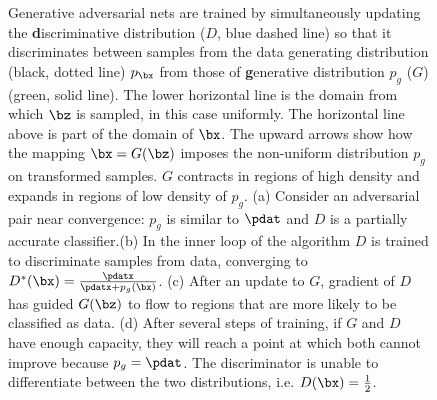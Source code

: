 
\begin{figure}[htb]
	\resizebox{0.2\textwidth}{!}{\subfigure[]{}}\hfill
	\resizebox{0.2\textwidth}{!}{\subfigure[]{}}\hfill
	\resizebox{0.2\textwidth}{!}{\subfigure[]{}}\hfill
	\resizebox{0.2\textwidth}{!}{\subfigure[]{}}\hfill

	\caption{Generative adversarial nets are trained by simultaneously updating the \textbf{d}iscriminative distribution ($D$, blue dashed line) so that it discriminates between samples from the data generating distribution (black, dotted line) $p_{\bx}$ from those of \textbf{g}enerative distribution $p_g$ ($G$) (green, solid line). The lower horizontal line is the domain from which $\bz$ is sampled, in this case uniformly. The horizontal line above is part of the domain of $\bx$. The upward arrows show how the mapping $\bx = G(\bz)$ imposes the non-uniform distribution $p_g$ on transformed samples. $G$ contracts in regions of high density and expands in regions of low density of $p_g$. (a) Consider an adversarial pair near convergence: $p_g$ is similar to $\pdat$ and $D$ is a partially accurate classifier.(b) In the inner loop of the algorithm $D$ is trained to discriminate samples from data, converging to $D^{\ast}(\bx) = \frac{\pdatx}{\pdatx+p_g(\bx)}$. (c) After an update to $G$, gradient of $D$ has guided $G(\bz)$ to flow to regions that are more likely to be classified as data. (d) After several steps of training, if $G$ and $D$ have enough capacity, they will reach a point at which both cannot improve because $p_g = \pdat$. The discriminator is unable to differentiate between the two distributions, i.e. $D(\bx)=\frac{1}{2}$.}
	\label{fig: figure 1}
\end{figure}